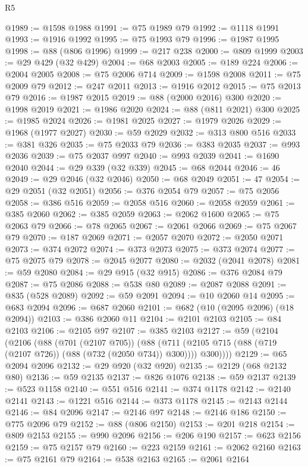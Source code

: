 \begin{lexlean}{R5}
\begin{coremodule}
@1989 := @1598 @1988
@1991 := @75 @1989 @79
@1992 := @1118 @1991
@1993 := @1916 @1992
@1995 := @75 @1993 @79
@1996 := @1987 @1995
@1998 := @88 (@806 @1996)
@1999 := @217 @238
@2000 := @809 @1999
@2003 := @29 @429 (@32 @429)
@2004 := @68 @2003
@2005 := @189 @224
@2006 := @2004 @2005
@2008 := @75 @2006 @714
@2009 := @1598 @2008
@2011 := @75 @2009 @79
@2012 := @247 @2011
@2013 := @1916 @2012
@2015 := @75 @2013 @79
@2016 := @1987 @2015
@2019 := @88 (@2000 @2016) @300
@2020 := @1998 @2019
@2021 := @1986 @2020
@2024 := @88 (@811 @2021) @300
@2025 := @1985 @2024
@2026 := @1981 @2025
@2027 := @1979 @2026
@2029 := @1968 (@1977 @2027)
@2030 := @59 @2029
@2032 := @313 @800 @516
@2033 := @381 @326
@2035 := @75 @2033 @79
@2036 := @383 @2035
@2037 := @993 @2036
@2039 := @75 @2037 @997
@2040 := @993 @2039
@2041 := @1690 @2040
@2044 := @29 @339 (@32 @339)
@2045 := @68 @2044
@2046 := 46
@2049 := @29 @2046 (@32 @2046)
@2050 := @68 @2049
@2051 := 47
@2054 := @29 @2051 (@32 @2051)
@2056 := @376 @2054 @79
@2057 := @75 @2056
@2058 := @386 @516
@2059 := @2058 @516
@2060 := @2058 @2059
@2061 := @385 @2060
@2062 := @385 @2059
@2063 := @2062 @1600
@2065 := @75 @2063 @79
@2066 := @78 @2065
@2067 := @2061 @2066
@2069 := @75 @2067 @79
@2070 := @187 @2069
@2071 := @2057 @2070
@2072 := @2050 @2071
@2073 := @374 @2072
@2074 := @373 @2073
@2075 := @373 @2074
@2077 := @75 @2075 @79
@2078 := @2045 @2077
@2080 := @2032 (@2041 @2078)
@2081 := @59 @2080
@2084 := @29 @915 (@32 @915)
@2086 := @376 @2084 @79
@2087 := @75 @2086
@2088 := @538 @80
@2089 := @2087 @2088
@2091 := @835 (@528 @2089)
@2092 := @59 @2091
@2094 := @10 @2060 @14
@2095 := @683 @2094
@2096 := @687 @2060
@2101 := @682 (@10 (@2095 @2096) (@18 @2094))
@2103 := @386 @2060 @11
@2104 := @2101 @2103
@2105 := @84 @2103
@2106 := @2105 @97
@2107 := @385 @2103
@2127 := @59
    (@2104
      (@2106
        (@88
          (@701 (@2107 @705))
          (@88 (@711 (@2105 @715 (@88 (@719 (@2107 @726)) (@88 (@732 (@2050 @734)) @300)))) @300))))
@2129 := @65 @2094 @2096
@2132 := @29 @920 (@32 @920)
@2135 := @2129 (@68 @2132 @80)
@2136 := @59 @2135
@2137 := @826 @1076
@2138 := @59 @2137
@2139 := @523 @1158
@2140 := @551 @516
@2141 := @374 @1178
@2142 := @2140 @2141
@2143 := @1221 @516
@2144 := @373 @1178
@2145 := @2143 @2144
@2146 := @84 @2096
@2147 := @2146 @97
@2148 := @2146 @186
@2150 := @775 @2096 @79
@2152 := @88 (@806 @2150)
@2153 := @201 @218
@2154 := @809 @2153
@2155 := @990 @2096
@2156 := @206 @190
@2157 := @623 @2156
@2159 := @75 @2157 @79
@2160 := @223 @2159
@2161 := @2062 @2160
@2163 := @75 @2161 @79
@2164 := @538 @2163
@2165 := @2061 @2164

\end{coremodule}
\end{lexlean}
